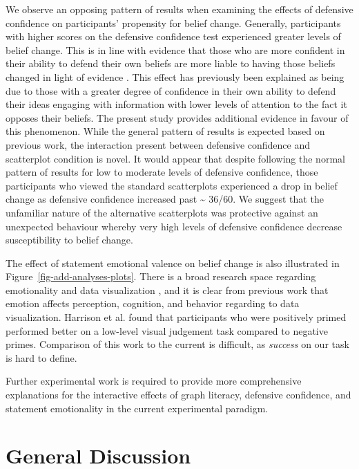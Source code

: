 \documentclass[manuscript,screen,review,anonymous]{acmart}
\begin{document}
We observe an opposing pattern of results when examining the effects of
defensive confidence on participants' propensity for belief change.
Generally, participants with higher scores on the defensive confidence
test experienced greater levels of belief change. This is in line with
evidence that those who are more confident in their ability to defend
their own beliefs are more liable to having those beliefs changed in
light of evidence \citep{albarracin_2004}. This effect has previously
been explained as being due to those with a greater degree of confidence
in their own ability to defend their ideas engaging with information
with lower levels of attention to the fact it opposes their beliefs. The
present study provides additional evidence in favour of this phenomenon.
While the general pattern of results is expected based on previous work,
the interaction present between defensive confidence and scatterplot
condition is novel. It would appear that despite following the normal
pattern of results for low to moderate levels of defensive confidence,
those participants who viewed the standard scatterplots experienced a
drop in belief change as defensive confidence increased past
\textasciitilde{} 36/60. We suggest that the unfamiliar nature of the
alternative scatterplots was protective against an unexpected behaviour
whereby very high levels of defensive confidence decrease susceptibility
to belief change.

The effect of statement emotional valence on belief change is also
illustrated in Figure~\ref{fig-add-analyses-plots}. There is a broad
research space regarding emotionality and data visualization
\citep{lan_2023}, and it is clear from previous work that emotion
affects perception, cognition, and behavior
\citep{phelps_2006, harrison_2013, thoresen_2016} regarding to data
visualization. Harrison et al. \citep{harrison_2013} found that
participants who were positively primed performed better on a low-level
visual judgement task compared to negative primes. Comparison of this
work to the current is difficult, as \emph{success} on our task is hard
to define.

Further experimental work is required to provide more comprehensive
explanations for the interactive effects of graph literacy, defensive
confidence, and statement emotionality in the current experimental
paradigm.

\section{General Discussion}\label{sec-general-discussion}
\end{document}
